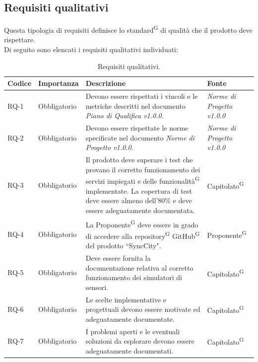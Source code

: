\documentclass[8pt]{article}
\newcommand{\glossterm}[1]{#1\textsuperscript{G}} %
\begin{document}
\subsection{Requisiti qualitativi}
Questa tipologia di requisiti definisce lo \glossterm{standard} di qualità che il prodotto deve rispettare. \\
Di seguito sono elencati i requisiti qualitativi individuati:
\begin{longtable}{|>{\centering\arraybackslash}p{1.2cm}|>{\centering\arraybackslash}p{2cm}|>{\centering\arraybackslash}p{8.5cm}|>{\centering\arraybackslash}p{3cm}|}
    \hline
    \rowcolor{white}
    \textbf{Codice} & \textbf{Importanza} & \textbf{Descrizione} & \textbf{Fonte} \\
    \hline
    \endfirsthead
    \rowcolor{white}
    \caption{Requisiti qualitativi.}
	\label{table:Requisiti qualitativi}
    \endlastfoot
            RQ-1 & Obbligatorio & Devono essere rispettati i vincoli e le metriche descritti nel documento \textit{Piano di Qualifica v1.0.0}. & \textit{Norme di Progetto v1.0.0} \\ \hline
            RQ-2 & Obbligatorio & Devono essere rispettate le norme specificate nel documento \textit{Norme di Progetto v1.0.0}. & \textit{Norme di Progetto v1.0.0} \\ \hline
            RQ-3 & Obbligatorio & Il prodotto deve superare i test che provano il corretto funzionamento dei servizi impiegati e delle \glossterm{funzionalità} implementate. La copertura di test deve essere almeno dell'80\% e deve essere adeguatamente documentata. & \glossterm{Capitolato} \\ \hline
            RQ-4 & Obbligatorio & La \glossterm{Proponente} deve essere in grado di accedere alla \glossterm{repository} \glossterm{GitHub} del prodotto ``SyncCity". & \glossterm{Proponente} \\ \hline
            RQ-5 & Obbligatorio & Deve essere fornita la documentazione relativa al corretto funzionamento dei simulatori di sensori. & \glossterm{Capitolato} \\ \hline
            RQ-6 & Obbligatorio & Le scelte implementative e progettuali devono essere motivate ed adeguatamente documentate. & \glossterm{Capitolato} \\ \hline
            RQ-7 & Obbligatorio & I problemi aperti e le eventuali soluzioni da esplorare devono essere adeguatamente documentati. & \glossterm{Capitolato} \\ \hline
\end{longtable}
\newpage
\end{document}
